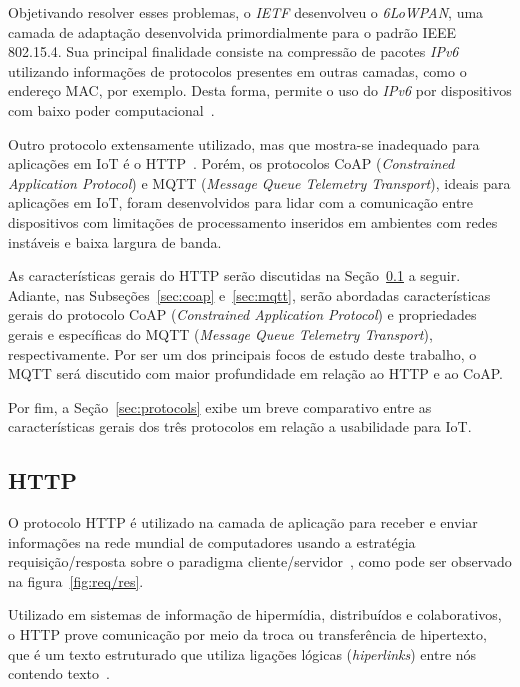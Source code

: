 Objetivando resolver esses problemas, o \textit{IETF} desenvolveu o \textit{6LoWPAN}, uma camada de adaptação desenvolvida primordialmente para o padrão IEEE 802.15.4. Sua principal finalidade consiste na compressão de pacotes \textit{IPv6} utilizando informações de protocolos presentes em outras camadas, como o endereço MAC, por exemplo. Desta forma, permite o uso do \textit{IPv6} por dispositivos com baixo poder computacional~\cite{kushalnagar2007ipv6}.

Outro protocolo extensamente utilizado, mas que mostra-se inadequado para aplicações em IoT é o HTTP~\cite{iot2016}. Porém, os protocolos CoAP (\textit{Constrained Application Protocol}) e MQTT (\textit{Message Queue Telemetry Transport}), ideais para aplicações em IoT, foram desenvolvidos para lidar com a comunicação entre dispositivos com limitações de processamento inseridos em ambientes com redes instáveis e baixa largura de banda. 

As características gerais do HTTP serão discutidas na Seção~\ref{sec:http} a seguir. Adiante, nas Subseções~\ref{sec:coap} e~\ref{sec:mqtt}, serão abordadas características gerais do protocolo CoAP (\textit{Constrained Application Protocol}) e propriedades gerais e específicas do MQTT (\textit{Message Queue Telemetry Transport}), respectivamente. Por ser um dos principais focos de estudo deste trabalho, o MQTT será discutido com maior profundidade em relação ao HTTP e ao CoAP.

Por fim, a Seção~\ref{sec:protocols} exibe um breve comparativo entre as características gerais dos três protocolos em relação a usabilidade para IoT. 

\subsection{HTTP}\label{sec:http}

O protocolo HTTP é utilizado na camada de aplicação para receber e enviar informações na rede mundial de computadores usando a estratégia requisição/resposta sobre o paradigma cliente/servidor~\cite{fielding2014hypertext}, como pode ser observado na figura~\ref{fig:req/res}.

Utilizado em sistemas de informação de hipermídia, distribuídos e colaborativos, o HTTP prove comunicação por meio da troca ou transferência de hipertexto, que é um texto estruturado que utiliza ligações lógicas (\textit{hiperlinks}) entre nós contendo texto~\cite{fielding2014hypertext}.

